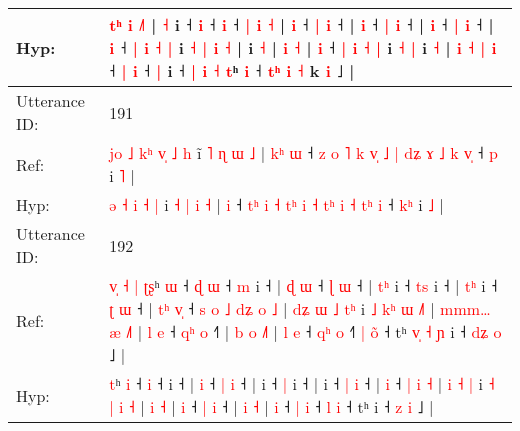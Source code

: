 \documentclass[10pt]{article}
\DeclareRobustCommand{\hl}[1]{{\textcolor{red}{#1}}}
\begin{document}
\begin{longtable}{ll}
 \\
Hyp: & \hl{}\hl{}\hl{}\hl{t}\hl{ʰ} \hl{i} \hl{}\hl{˩}\hl{˥} | \hl{˧} i ˧\hl{}\hl{} \hl{}\hl{i} ˧\hl{}\hl{} \hl{i} ˧ \hl{|} \hl{i} \hl{˧} |\hl{}\hl{} \hl{i} ˧ \hl{|} \hl{i} ˧\hl{}\hl{}\hl{}\hl{}\hl{} |\hl{}\hl{} \hl{i} ˧ \hl{|} \hl{i} ˧ |\hl{}\hl{} \hl{i} ˧ \hl{}\hl{}\hl{|} \hl{i} ˧ |\hl{}\hl{}\hl{}\hl{}\hl{}\hl{}\hl{} \hl{}\hl{i} ˧ \hl{}\hl{|} \hl{i} \hl{˧} \hl{|} i\hl{} \hl{˧} \hl{}\hl{|} \hl{i} \hl{˧} |\hl{}\hl{}\hl{} i \hl{}\hl{˧} | \hl{}\hl{i} \hl{}\hl{˧} |\hl{}\hl{}\hl{} \hl{}\hl{i} ˧ \hl{}\hl{|} \hl{i} \hl{˧} \hl{|} i \hl{˧} \hl{|} i \hl{˧} | \hl{}\hl{i}\hl{ }\hl{˧} \hl{|} \hl{i} ˧ \hl{}\hl{|} \hl{}\hl{i} ˧ \hl{|} i\hl{} ˧\hl{}\hl{} \hl{|} \hl{i} \hl{˧} \hl{t}ʰ \hl{i} ˧ \hl{t}\hl{ʰ} \hl{i} \hl{˧} k \hl{}\hl{i} ˩ |
 \\
\midrule
Utterance ID: & 191 \\
Ref: & \hl{j}\hl{o}\hl{ }\hl{˩} \hl{k}\hl{ʰ} \hl{v}\hl{̩} \hl{˩} \hl{h} i\hl{̃} \hl{˥} \hl{ɳ} \hl{ɯ} \hl{˩} |\hl{ }\hl{k}\hl{ʰ} \hl{ɯ} ˧ \hl{z}\hl{ }\hl{o} \hl{˥} \hl{k} \hl{v}\hl{̩} \hl{˩} \hl{|} \hl{d}\hl{ʑ} \hl{ɤ} \hl{˩} \hl{k}\hl{ }\hl{v}\hl{̩} ˧ \hl{}\hl{p} i \hl{˥} |
 \\
Hyp: & \hl{}\hl{}\hl{}\hl{ə} \hl{}\hl{˧} \hl{}\hl{i} \hl{˧} \hl{|} i\hl{} \hl{˧} \hl{|} \hl{i} \hl{˧} |\hl{}\hl{}\hl{} \hl{i} ˧ \hl{}\hl{t}\hl{ʰ} \hl{i} \hl{˧} \hl{t}\hl{ʰ} \hl{i} \hl{˧} \hl{t}\hl{ʰ} \hl{i} \hl{˧} \hl{t}\hl{ʰ}\hl{ }\hl{i} ˧ \hl{k}\hl{ʰ} i \hl{˩} |
 \\
\midrule
Utterance ID: & 192 \\
Ref: & \hl{v}\hl{̩}\hl{ }\hl{˧}\hl{ }\hl{|}\hl{ }\hl{ʈ}\hl{ʂ}ʰ \hl{ɯ} ˧\hl{ }\hl{ɖ} \hl{ɯ} ˧\hl{ }\hl{m} i ˧ |\hl{ }\hl{ɖ} \hl{ɯ} ˧ \hl{ɭ} \hl{ɯ} ˧ |\hl{ }\hl{t}\hl{ʰ} i ˧ \hl{t}\hl{s} i ˧ |\hl{ }\hl{t}\hl{ʰ} i ˧ \hl{ʈ} \hl{ɯ} ˧ |\hl{ }\hl{t}\hl{ʰ} \hl{v}\hl{̩} ˧\hl{ }\hl{s}\hl{ }\hl{o}\hl{ }\hl{˩} \hl{d}\hl{ʑ} \hl{o} \hl{˩} |\hl{ }\hl{d}\hl{ʑ} \hl{ɯ} \hl{˩} \hl{t}\hl{ʰ} i \hl{˩} \hl{k}\hl{ʰ} \hl{ɯ} \hl{˩}\hl{˥} |\hl{ }\hl{m}\hl{m}\hl{m}\hl{…} \hl{æ} \hl{˩}\hl{˥} |\hl{ }\hl{l} \hl{e} ˧ \hl{q}\hl{ʰ} \hl{o} ˧\hl{˥} |\hl{ }\hl{b} \hl{o} \hl{˩}\hl{˥} |\hl{ }\hl{l} \hl{e} ˧ \hl{q}\hl{ʰ} \hl{o} ˧\hl{˥} \hl{|} \hl{o}\hl{̃} ˧ tʰ\hl{ }\hl{v}\hl{̩}\hl{ }\hl{˧}\hl{ }\hl{ɲ} i ˧ \hl{d}\hl{ʑ} \hl{o} ˩ |
 \\
Hyp: & \hl{}\hl{}\hl{}\hl{}\hl{}\hl{}\hl{}\hl{}\hl{t}ʰ \hl{i} ˧\hl{}\hl{} \hl{i} ˧\hl{}\hl{} i ˧ |\hl{}\hl{} \hl{i} ˧ \hl{|} \hl{i} ˧ |\hl{}\hl{}\hl{} i ˧ \hl{}\hl{|} i ˧ |\hl{}\hl{}\hl{} i ˧ \hl{|} \hl{i} ˧ |\hl{}\hl{}\hl{} \hl{}\hl{i} ˧\hl{}\hl{}\hl{}\hl{}\hl{}\hl{} \hl{}\hl{|} \hl{i} \hl{˧} |\hl{}\hl{}\hl{} \hl{i} \hl{˧} \hl{}\hl{|} i \hl{˧} \hl{}\hl{|} \hl{i} \hl{}\hl{˧} |\hl{}\hl{}\hl{}\hl{}\hl{} \hl{i} \hl{}\hl{˧} |\hl{}\hl{} \hl{i} ˧ \hl{}\hl{|} \hl{i} ˧\hl{} |\hl{}\hl{} \hl{i} \hl{}\hl{˧} |\hl{}\hl{} \hl{i} ˧ \hl{}\hl{|} \hl{i} ˧\hl{} \hl{l} \hl{}\hl{i} ˧ tʰ\hl{}\hl{}\hl{}\hl{}\hl{}\hl{}\hl{} i ˧ \hl{}\hl{z} \hl{i} ˩ |

\end{longtable}
\end{document}
